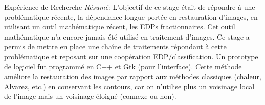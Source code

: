 \begin{rubric}{Expérience de Recherche}
   \textit{Résumé}: L’objectif de ce stage était de répondre à une
   problématique récente, la dépendance longue portée en restauration
   d’images, en utilisant un outil mathématique récent, les EDPs
   fractionnaires. Cet outil mathématique n’a encore jamais été
   utilisé en traitement d’images. Ce stage a permis de mettre en
   place une chaîne de traitements répondant à cette problématique et
   reposant sur une coopération EDP/classification. Un prototype de
   logiciel fut programmé en C++ et Gtk (pour l’interface). Cette
   méthode améliore la restauration des images par rapport aux
   méthodes classiques (chaleur, Alvarez, etc.) en conservant les
   contours, car on n’utilise plus un voisinage local de l’image mais
   un voisinage éloigné (connexe ou non).


\end{rubric}
